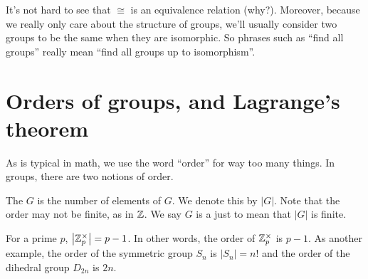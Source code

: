 It's not hard to see that $\cong$ is an equivalence relation (why?).
Moreover, because we really only care about the structure of groups,
we'll usually consider two groups to be the same when they are isomorphic.
So phrases such as ``find all groups'' really mean 
``find all groups up to isomorphism''.

\section{Orders of groups, and Lagrange's theorem}

As is typical in math, we use the word ``order'' for way too many things.
In groups, there are two notions of order.
\begin{definition}
	The  $G$ is the number of elements of $G$.
	We denote this by $\left\lvert G \right\rvert$.
	Note that the order may not be finite, as in $\mathbb Z$.
	We say $G$ is a  just to mean that $\left\lvert G \right\rvert$ is finite.
\end{definition}
\begin{example}
	For a prime $p$, $\left\lvert \mathbb Z_{p}^\times \right\rvert = p-1$.
	In other words, the order of $\mathbb Z_{p}^\times$ is $p-1$.
	As another example,
	the order of the symmetric group $S_n$ is $\left\lvert S_n \right\rvert = n!$
	and the order of the dihedral group $D_{2n}$ is $2n$.
\end{example}

